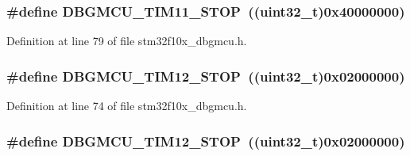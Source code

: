 \subsubsection[{\texorpdfstring{D\+B\+G\+M\+C\+U\+\_\+\+T\+I\+M11\+\_\+\+S\+T\+OP}{DBGMCU_TIM11_STOP}}]{\setlength{\rightskip}{0pt plus 5cm}\#define D\+B\+G\+M\+C\+U\+\_\+\+T\+I\+M11\+\_\+\+S\+T\+OP~(({\bf uint32\+\_\+t})0x40000000)}\hypertarget{group___d_b_g_m_c_u___exported___constants_gade03e5368c3bf8a2f43fc046f1d87f30}{}\label{group___d_b_g_m_c_u___exported___constants_gade03e5368c3bf8a2f43fc046f1d87f30}


Definition at line 79 of file stm32f10x\+\_\+dbgmcu.\+h.

\subsubsection[{\texorpdfstring{D\+B\+G\+M\+C\+U\+\_\+\+T\+I\+M12\+\_\+\+S\+T\+OP}{DBGMCU_TIM12_STOP}}]{\setlength{\rightskip}{0pt plus 5cm}\#define D\+B\+G\+M\+C\+U\+\_\+\+T\+I\+M12\+\_\+\+S\+T\+OP~(({\bf uint32\+\_\+t})0x02000000)}\hypertarget{group___d_b_g_m_c_u___exported___constants_ga4814287cef24f57e795b0f5b0174b49c}{}\label{group___d_b_g_m_c_u___exported___constants_ga4814287cef24f57e795b0f5b0174b49c}


Definition at line 74 of file stm32f10x\+\_\+dbgmcu.\+h.

\subsubsection[{\texorpdfstring{D\+B\+G\+M\+C\+U\+\_\+\+T\+I\+M12\+\_\+\+S\+T\+OP}{DBGMCU_TIM12_STOP}}]{\setlength{\rightskip}{0pt plus 5cm}\#define D\+B\+G\+M\+C\+U\+\_\+\+T\+I\+M12\+\_\+\+S\+T\+OP~(({\bf uint32\+\_\+t})0x02000000)}\hypertarget{group___d_b_g_m_c_u___exported___constants_ga4814287cef24f57e795b0f5b0174b49c}{}\label{group___d_b_g_m_c_u___exported___constants_ga4814287cef24f57e795b0f5b0174b49c}


